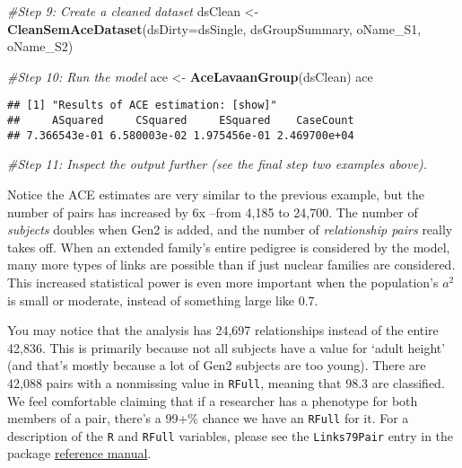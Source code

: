 \documentclass[smallextended]{svjour3}       %
\newenvironment{Shaded}{\begin{snugshade}}{\end{snugshade}}
\newcommand{\CommentTok}[1]{\textcolor[rgb]{0.56,0.35,0.01}{\textit{#1}}}
\newcommand{\DataTypeTok}[1]{\textcolor[rgb]{0.13,0.29,0.53}{#1}}
\newcommand{\KeywordTok}[1]{\textcolor[rgb]{0.13,0.29,0.53}{\textbf{#1}}}
\newcommand{\NormalTok}[1]{#1}
\newcommand{\StringTok}[1]{\textcolor[rgb]{0.31,0.60,0.02}{#1}}
\begin{document}
\begin{Shaded}
\begin{Highlighting}[]
\CommentTok{#Step 9: Create a cleaned dataset}
\NormalTok{dsClean <-}\StringTok{ }\KeywordTok{CleanSemAceDataset}\NormalTok{(}\DataTypeTok{dsDirty=}\NormalTok{dsSingle, dsGroupSummary, oName_S1, oName_S2)}

\CommentTok{#Step 10: Run the model}
\NormalTok{ace <-}\StringTok{ }\KeywordTok{AceLavaanGroup}\NormalTok{(dsClean)}
\NormalTok{ace}
\end{Highlighting}
\end{Shaded}

\begin{verbatim}
## [1] "Results of ACE estimation: [show]"
##     ASquared     CSquared     ESquared    CaseCount 
## 7.366543e-01 6.580003e-02 1.975456e-01 2.469700e+04
\end{verbatim}

\begin{Shaded}
\begin{Highlighting}[]
\CommentTok{#Step 11: Inspect the output further (see the final step two examples above).}
\end{Highlighting}
\end{Shaded}

Notice the ACE estimates are very similar to the previous example, but
the number of pairs has increased by 6x --from 4,185 to 24,700. The
number of \emph{subjects} doubles when Gen2 is added, and the number of
\emph{relationship pairs} really takes off. When an extended family's
entire pedigree is considered by the model, many more types of links are
possible than if just nuclear families are considered. This increased
statistical power is even more important when the population's \(a^2\)
is small or moderate, instead of something large like 0.7.

You may notice that the analysis has 24,697 relationships instead of the
entire 42,836. This is primarily because not all subjects have a value
for `adult height' (and that's mostly because a lot of Gen2 subjects are
too young). There are 42,088 pairs with a nonmissing value in
\texttt{RFull}, meaning that 98.3 are classified. We feel comfortable
claiming that if a researcher has a phenotype for both members of a
pair, there's a 99+\% chance we have an \texttt{RFull} for it. For a
description of the \texttt{R} and \texttt{RFull} variables, please see
the \texttt{Links79Pair} entry in the package
\href{https://cran.r-project.org/package=NlsyLinks/NlsyLinks.pdf}{reference
manual}.
\end{document}
